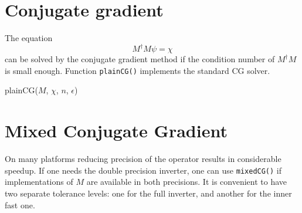 \documentclass[oneside,openright]{report}
\newcommand{\DontPrintSemicolon}{\dontprintsemicolon}
\begin{document}
\section{Conjugate gradient}
The equation
\[
   M^\dagger M \psi = \chi
\]
can be solved by the conjugate gradient method if the condition number of
 $M^\dagger M$ is small enough. Function \texttt{plainCG()} implements the standard CG solver.
\begin{function}
\DontPrintSemicolon
{}

\caption{plainCG($M$, $\chi$, $n$, $\epsilon$)}
\end{function}

\section{Mixed Conjugate Gradient}
On many platforms reducing precision of the operator results in considerable speedup. If one needs the double precision inverter, one can use \texttt{mixedCG()} if implementations of $M$ are available in both precisions. It is convenient to have two separate tolerance levels: one for the full inverter, and another for the inner fast one.
\end{document}
